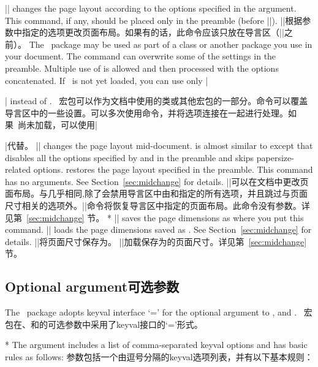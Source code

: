 \begin{paracol}{2}
||
changes the page layout according to the options specified in the
argument. This command, if any, should be placed only in the
preamble (before ||).
\switchcolumn
||根据参数中指定的选项更改页面布局。如果有的话，此命令应该只放在导言区（||之前）。
\switchcolumn
The \Gm\ package may be used as part of a class or another package
you use in your document. The command  can overwrite
some of the settings in the preamble. Multiple use of 
is allowed and then processed with the options concatenated.
If \Gm\ is not yet loaded, you can use only
|\usepackage[||]{geometry}| instead of .
\switchcolumn
\Gm\ 宏包可以作为文档中使用的类或其他宏包的一部分。命令可以覆盖导言区中的一些设置。可以多次使用命令，并将选项连接在一起进行处理。如果\Gm\ 尚未加载，可以使用|\usepackage[||]{geometry}|代替。    
\switchcolumn
\medskip
||
changes the page layout mid-document.  is almost
similar to  except that  disables all
the options specified by  and  in
the preamble and skips papersize-related options. 
restores the page layout specified in the preamble. This command
has no arguments. See Section~\ref{sec:midchange} for details.
\switchcolumn
\medskip
||可以在文档中更改页面布局。与几乎相同,除了会禁用导言区中由和指定的所有选项，并且跳过与页面尺寸相关的选项外。|\restoregeometry|命令将恢复导言区中指定的页面布局。此命令没有参数。详见第~\ref{sec:midchange} 节。
\switchcolumn[0]*
\medskip
||
saves the page dimensions as  where you put
this command.
||
loads the page dimensions saved as . See
Section~\ref{sec:midchange} for details.
\switchcolumn
\medskip
||将页面尺寸保存为。
||加载保存为的页面尺寸。详见第~\ref{sec:midchange} 节。
\end{paracol}


\subsection{Optional argument\hfill 可选参数}

\begin{paracol}{2}
The \Gm\ package adopts \textsf{keyval} interface
`=' for the optional argument to
,  and .
\switchcolumn
\Gm\ 宏包在、和的可选参数中采用了\textsf{keyval}接口的`='形式。

\switchcolumn[0]*
The argument includes a list of comma-separated \textsf{keyval}
options and has basic rules as follows:
\switchcolumn
参数包括一个由逗号分隔的\textsf{keyval}选项列表，并有以下基本规则：
\end{paracol}


